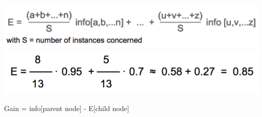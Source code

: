 \begin{breakbox}
\begin{breakbox}
\begin{center}
\includegraphics[width=.15\textwidth]{slides_images/entropy}
\includegraphics[width=.15\textwidth]{slides_images/entropy_example}
\end{center}
\end{breakbox}

\begin{breakbox}
\newline Gain = info[parent node] - E[child node]
\end{breakbox}

\end{breakbox}

